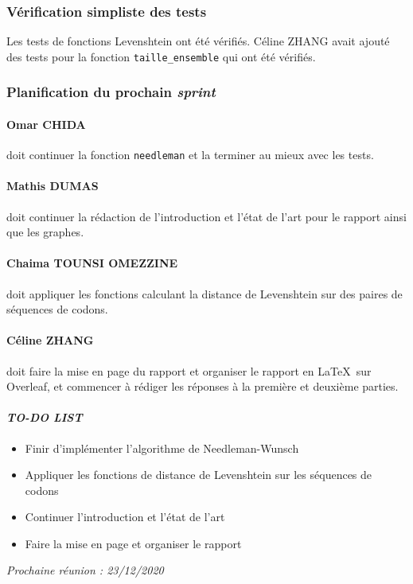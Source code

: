 
\subsubsection*{Vérification simpliste des tests}
Les tests de fonctions Levenshtein ont été vérifiés. Céline ZHANG avait ajouté des tests pour la fonction \texttt{taille\_ensemble} qui ont été vérifiés.

\subsubsection*{Planification du prochain \textsl{sprint}}
\paragraph*{Omar CHIDA} doit continuer la fonction \texttt{needleman} et la terminer au mieux avec les tests.

\paragraph*{Mathis DUMAS} doit continuer la rédaction de l'introduction et l'état de l'art pour le rapport ainsi que les graphes.

\paragraph*{Chaima TOUNSI OMEZZINE} doit appliquer les fonctions calculant la distance de Levenshtein sur des paires de séquences de codons.

\paragraph*{Céline ZHANG} doit faire la mise en page du rapport et organiser le rapport en \LaTeX \ sur \textsf{Overleaf}, et commencer à rédiger les réponses à la première et deuxième parties.

\paragraph{\emph{TO-DO LIST}}
\begin{itemize}
    \item Finir d'implémenter l'algorithme de Needleman-Wunsch
    \item Appliquer les fonctions de distance de Levenshtein sur les séquences de codons
    \item Continuer l'introduction et l'état de l'art
    \item Faire la mise en page et organiser le rapport
\end{itemize}

\emph{Prochaine réunion : 23/12/2020}\\

% 